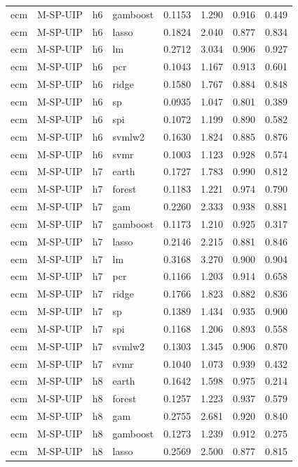 \begin{ThreePartTable}
\begin{longtable}[t]{llclcccc}
ecm & M-SP-UIP & h6 & gamboost & 0.1153 & 1.290 & 0.916 & 0.449\\
ecm & M-SP-UIP & h6 & lasso & 0.1824 & 2.040 & 0.877 & 0.834\\
ecm & M-SP-UIP & h6 & lm & 0.2712 & 3.034 & 0.906 & 0.927\\
ecm & M-SP-UIP & h6 & pcr & 0.1043 & 1.167 & 0.913 & 0.601\\
ecm & M-SP-UIP & h6 & ridge & 0.1580 & 1.767 & 0.884 & 0.848\\
ecm & M-SP-UIP & h6 & sp & 0.0935 & 1.047 & 0.801 & 0.389\\
ecm & M-SP-UIP & h6 & spi & 0.1072 & 1.199 & 0.890 & 0.582\\
ecm & M-SP-UIP & h6 & svmlw2 & 0.1630 & 1.824 & 0.885 & 0.876\\
ecm & M-SP-UIP & h6 & svmr & 0.1003 & 1.123 & 0.928 & 0.574\\
\addlinespace
ecm & M-SP-UIP & h7 & earth & 0.1727 & 1.783 & 0.990 & 0.812\\
ecm & M-SP-UIP & h7 & forest & 0.1183 & 1.221 & 0.974 & 0.790\\
ecm & M-SP-UIP & h7 & gam & 0.2260 & 2.333 & 0.938 & 0.881\\
ecm & M-SP-UIP & h7 & gamboost & 0.1173 & 1.210 & 0.925 & 0.317\\
ecm & M-SP-UIP & h7 & lasso & 0.2146 & 2.215 & 0.881 & 0.846\\
ecm & M-SP-UIP & h7 & lm & 0.3168 & 3.270 & 0.900 & 0.904\\
ecm & M-SP-UIP & h7 & pcr & 0.1166 & 1.203 & 0.914 & 0.658\\
ecm & M-SP-UIP & h7 & ridge & 0.1766 & 1.823 & 0.882 & 0.836\\
ecm & M-SP-UIP & h7 & sp & 0.1389 & 1.434 & 0.935 & 0.900\\
ecm & M-SP-UIP & h7 & spi & 0.1168 & 1.206 & 0.893 & 0.558\\
ecm & M-SP-UIP & h7 & svmlw2 & 0.1303 & 1.345 & 0.906 & 0.870\\
ecm & M-SP-UIP & h7 & svmr & 0.1040 & 1.073 & 0.939 & 0.432\\
\addlinespace
ecm & M-SP-UIP & h8 & earth & 0.1642 & 1.598 & 0.975 & 0.214\\
ecm & M-SP-UIP & h8 & forest & 0.1257 & 1.223 & 0.937 & 0.579\\
ecm & M-SP-UIP & h8 & gam & 0.2755 & 2.681 & 0.920 & 0.840\\
ecm & M-SP-UIP & h8 & gamboost & 0.1273 & 1.239 & 0.912 & 0.275\\
ecm & M-SP-UIP & h8 & lasso & 0.2569 & 2.500 & 0.877 & 0.815\\

\end{longtable}
\end{ThreePartTable}
